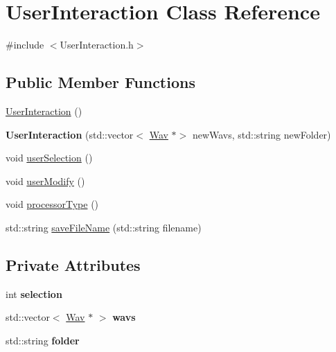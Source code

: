 \hypertarget{classUserInteraction}{}\section{User\+Interaction Class Reference}
\label{classUserInteraction}


{\ttfamily \#include $<$User\+Interaction.\+h$>$}

\subsection*{Public Member Functions}
\begin{DoxyCompactItemize}
\item 
\hyperlink{classUserInteraction_a7e2132169f69dffcbd9a4f178054c917}{User\+Interaction} ()
\item 
\mbox{\label{classUserInteraction_a6d47d32db1cfcb16c572c629ea6b8112}} 
{\bfseries User\+Interaction} (std\+::vector$<$ \hyperlink{classWav}{Wav} $\ast$$>$ new\+Wavs, std\+::string new\+Folder)
\item 
void \hyperlink{classUserInteraction_af0f20f9766feea9312be9e1009e693b8}{user\+Selection} ()
\item 
void \hyperlink{classUserInteraction_ad019168c00904e9f57df69940e4873c0}{user\+Modify} ()
\item 
void \hyperlink{classUserInteraction_a3b1ea7fb9056d2fcada684ff115220f3}{processor\+Type} ()
\item 
std\+::string \hyperlink{classUserInteraction_aae3cb625928ae673c47f917650dcb335}{save\+File\+Name} (std\+::string filename)
\end{DoxyCompactItemize}
\subsection*{Private Attributes}
\begin{DoxyCompactItemize}
\item 
\mbox{\label{classUserInteraction_afd9f4669b4ca5f5b8071e61aeced2e92}} 
int {\bfseries selection}
\item 
\mbox{\label{classUserInteraction_a65578d23f4317b3ac7b08155b3b4fe9a}} 
std\+::vector$<$ \hyperlink{classWav}{Wav} $\ast$ $>$ {\bfseries wavs}
\item 
\mbox{\label{classUserInteraction_a27613d3d241b657945c5c2880b17b18d}} 
std\+::string {\bfseries folder}
\end{DoxyCompactItemize}


